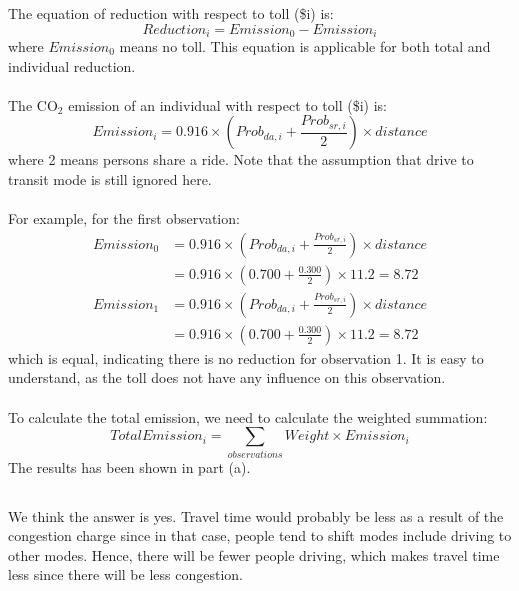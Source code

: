 \documentclass[11pt]{article}
\begin{document}
\subsubsection{}
The equation of reduction with respect to toll (\$i) is:
\begin{equation}
Reduction_i=Emission_0-Emission_i
\end{equation}
where $Emission_0$ means no toll. This equation is applicable for both total and individual reduction.\\\\
The CO$_2$ emission of an individual with respect to toll (\$i) is: 
\begin{equation}
Emission_i=0.916\times(Prob_{da,i}+\frac{Prob_{sr,i}}{2})\times distance
\end{equation}
where 2 means persons share a ride. Note that the assumption that drive to transit mode is still ignored here.\\\\
For example, for the first observation:
\begin{equation}
\begin{array}{ll}
Emission_0&=0.916\times\left(Prob_{da,i}+\frac{Prob_{sr,i}}{2}\right)\times distance\\
&=0.916\times\left(0.700+\frac{0.300}{2}\right)\times 11.2=8.72
\end{array}
\end{equation}
\begin{equation}
\begin{array}{ll}
Emission_1&=0.916\times\left(Prob_{da,i}+\frac{Prob_{sr,i}}{2}\right)\times distance\\
&=0.916\times\left(0.700+\frac{0.300}{2}\right)\times 11.2=8.72
\end{array}
\end{equation} 
which is equal, indicating there is no reduction for observation 1. It is easy to understand, as the toll does not have any influence on this observation.\\\\
To calculate the total emission, we need to calculate the weighted summation:
\begin{equation}
TotalEmission_i=\sum_{observations}Weight\times Emission_i
\end{equation}
The results has been shown in part (a).
\subsection{}
\subsubsection{}
We think the answer is yes. Travel time would probably be less as a result of the congestion charge since in that case, people tend to shift modes include driving to other modes. Hence, there will be fewer people driving, which makes travel time less since there will be less congestion.
\end{document}
